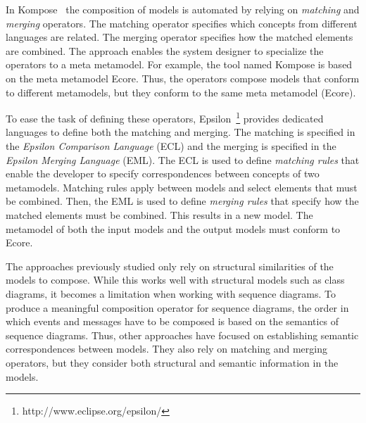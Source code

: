 In Kompose~\cite{kompose} the composition of models is automated by relying on \emph{matching} and \emph{merging} operators. The matching operator specifies which concepts from different languages are related. The merging operator specifies how the matched elements are combined. The approach enables the system designer to specialize the operators to a meta metamodel. For example, the tool named Kompose is based on the meta metamodel Ecore. Thus, the operators compose models that conform to different metamodels, but they conform to the same meta metamodel (\ie Ecore).

To ease the task of defining these operators, Epsilon~\cite{epsilon}\footnote{http://www.eclipse.org/epsilon/} provides dedicated languages to define both the matching and merging. The matching is specified in the \emph{Epsilon Comparison Language} (ECL) and the merging is specified in the \emph{Epsilon Merging Language} (EML). The ECL is used to define \emph{matching rules} that enable the developer to specify correspondences between concepts of two metamodels. Matching rules apply between models and select elements that must be combined. Then, the EML is used to define \emph{merging rules} that specify how the matched elements must be combined. This results in a new model. The metamodel of both the input models and the output models must conform to Ecore.



The approaches previously studied only rely on structural similarities of the models to compose. While this works well with structural models such as class diagrams, it becomes a limitation when working with sequence diagrams. To produce a meaningful composition operator for sequence diagrams, the order in which events and messages have to be composed is based on the semantics of sequence diagrams. Thus, other approaches have focused on establishing semantic correspondences between models. They also rely on matching and merging operators, but they consider both structural and semantic information in the models.  


